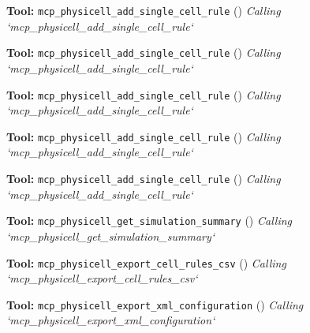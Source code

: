 \documentclass[11pt,a4paper]{article}
\begin{document}
\begin{toolokbox}
\textbf{Tool:} \texttt{mcp\_physicell\_add\_single\_cell\_rule} (\checkmark)
\textit{Calling `mcp\_physicell\_add\_single\_cell\_rule`}
\end{toolokbox}
\begin{toolokbox}
\textbf{Tool:} \texttt{mcp\_physicell\_add\_single\_cell\_rule} (\checkmark)
\textit{Calling `mcp\_physicell\_add\_single\_cell\_rule`}
\end{toolokbox}
\begin{toolokbox}
\textbf{Tool:} \texttt{mcp\_physicell\_add\_single\_cell\_rule} (\checkmark)
\textit{Calling `mcp\_physicell\_add\_single\_cell\_rule`}
\end{toolokbox}
\begin{toolokbox}
\textbf{Tool:} \texttt{mcp\_physicell\_add\_single\_cell\_rule} (\checkmark)
\textit{Calling `mcp\_physicell\_add\_single\_cell\_rule`}
\end{toolokbox}
\begin{toolokbox}
\textbf{Tool:} \texttt{mcp\_physicell\_add\_single\_cell\_rule} (\checkmark)
\textit{Calling `mcp\_physicell\_add\_single\_cell\_rule`}
\end{toolokbox}
\begin{toolokbox}
\textbf{Tool:} \texttt{mcp\_physicell\_get\_simulation\_summary} (\checkmark)
\textit{Calling `mcp\_physicell\_get\_simulation\_summary`}
\end{toolokbox}
\begin{toolokbox}
\textbf{Tool:} \texttt{mcp\_physicell\_export\_cell\_rules\_csv} (\checkmark)
\textit{Calling `mcp\_physicell\_export\_cell\_rules\_csv`}
\end{toolokbox}
\begin{toolokbox}
\textbf{Tool:} \texttt{mcp\_physicell\_export\_xml\_configuration} (\checkmark)
\textit{Calling `mcp\_physicell\_export\_xml\_configuration`}
\end{toolokbox}
\end{document}

